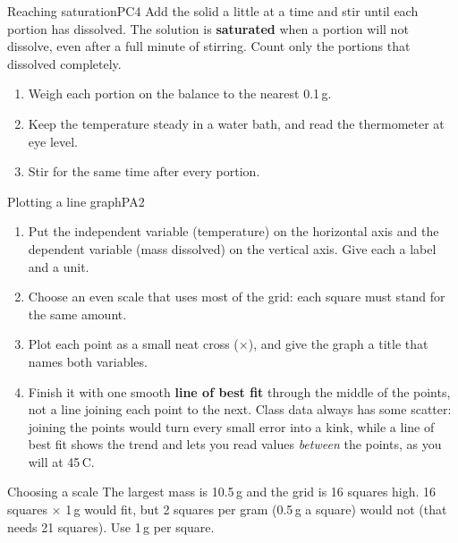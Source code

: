 
\begin{technique}{Reaching saturation}{PC4}
Add the solid a little at a time and stir until each portion has dissolved. The solution is \textbf{saturated} when a portion will not dissolve, even after a full minute of stirring. Count only the portions that dissolved completely.
\begin{enumerate}[leftmargin=1.6em, itemsep=1pt, topsep=3pt]
  \item Weigh each portion on the balance to the nearest 0.1\,g.
  \item Keep the temperature steady in a water bath, and read the thermometer at eye level.
  \item Stir for the same time after every portion.
\end{enumerate}
\end{technique}

\begin{technique}{Plotting a line graph}{PA2}
\begin{enumerate}[leftmargin=1.6em, itemsep=1pt, topsep=3pt]
  \item Put the independent variable (temperature) on the horizontal axis and the dependent variable (mass dissolved) on the vertical axis. Give each a label and a unit.
  \item Choose an even scale that uses most of the grid: each square must stand for the same amount.
  \item Plot each point as a small neat cross ($\times$), and give the graph a title that names both variables.
  \item Finish it with one smooth \textbf{line of best fit} through the middle of the points, not a line joining each point to the next. Class data always has some scatter: joining the points would turn every small error into a kink, while a line of best fit shows the trend and lets you read values \emph{between} the points, as you will at 45\,\textdegree C.
\end{enumerate}
\end{technique}

\begin{workedex}{Choosing a scale}
The largest mass is 10.5\,g and the grid is 16 squares high. 16 squares $\times$ 1\,g would fit, but 2 squares per gram (0.5\,g a square) would not (that needs 21 squares). Use 1\,g per square.
\end{workedex}

